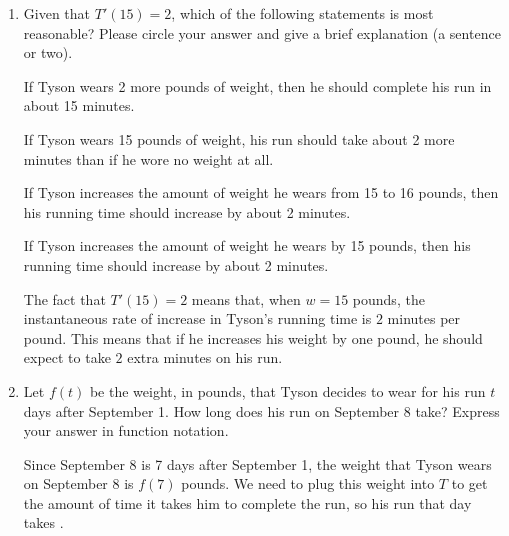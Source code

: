 \documentclass{article}
\theoremstyle{theorem}
\begin{document}
\begin{enumerate}
\begin{enumerate}
\begin{solution}
      Another way to think about this is to think about the graph of $T(w)$: it should be increasing because higher weight corresponds to longer time. Therefore, the tangent lines of the graph should all have positive slope.
    \end{solution}

  \item Given that $T'(15) = 2$, which of the following statements is most reasonable? Please circle your answer and give a brief explanation (a sentence or two).

    \begin{altenumerate}[label=\protect\maybecircle{\Alph*.}]
    \plainitem If Tyson wears 2 more pounds of weight, then he should complete his run in about 15 minutes.

    \plainitem If Tyson wears 15 pounds of weight, his run should take about 2 more minutes than if he wore no weight at all.

    \circleitem \label{fall2013-1a-midterm1-7-answer} If Tyson increases the amount of weight he wears from 15 to 16 pounds, then his running time should increase by about 2 minutes.

    \plainitem If Tyson increases the amount of weight he wears by 15 pounds, then his running time should increase by about 2 minutes.

    \end{altenumerate}

    \pspace{\vfill}

    \begin{solution}
      The fact that $T'(15) = 2$ means that, when $w = 15$ pounds, the instantaneous rate of increase in Tyson's running time is $2$ minutes per pound. This means that if he increases his weight by one pound, he should expect to take $2$ extra minutes on his run.
    \end{solution}

  \item
    \begin{problem}[\stretch{0.5}]
      Let $f(t)$ be the weight, in pounds, that Tyson decides to wear for his run $t$ days after September 1. How long does his run on September 8 take? Express your answer in function notation.
    \end{problem}

    \begin{solution}
      Since September 8 is 7 days after September 1, the weight that Tyson wears on September 8 is $f(7)$ pounds. We need to plug this weight into $T$ to get the amount of time it takes him to complete the run, so his run that day takes . 
    \end{solution}

  \end{enumerate}

\end{enumerate}
\end{document}
